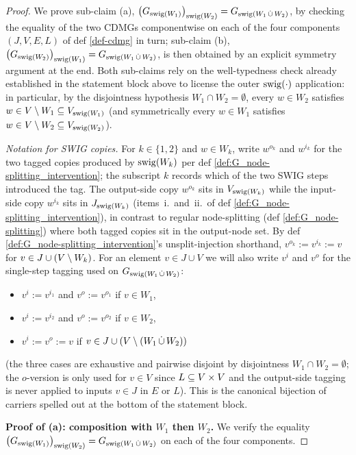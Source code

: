 \documentclass[main]{subfiles}
\begin{document}
\begin{proof}
We prove sub-claim (a), $\left ( G_{\mathrm{swig}(W_1)} \right )_{\mathrm{swig}(W_2)} = G_{\mathrm{swig}(W_1 \,\dot{\cup}\, W_2)}$, by checking the equality of the two CDMGs componentwise on each of the four components $(J, V, E, L)$ of def \ref{def-cdmg} in turn; sub-claim (b), $\left ( G_{\mathrm{swig}(W_2)} \right )_{\mathrm{swig}(W_1)} = G_{\mathrm{swig}(W_1 \,\dot{\cup}\, W_2)}$, is then obtained by an explicit symmetry argument at the end. Both sub-claims rely on the well-typedness check already established in the statement block above to license the outer $\mathrm{swig}(\cdot)$ application: in particular, by the disjointness hypothesis $W_1 \cap W_2 = \emptyset$, every $w \in W_2$ satisfies $w \in V \setminus W_1 \subseteq V_{\mathrm{swig}(W_1)}$ (and symmetrically every $w \in W_1$ satisfies $w \in V \setminus W_2 \subseteq V_{\mathrm{swig}(W_2)}$).

\smallskip\noindent\emph{Notation for SWIG copies.}
For $k \in \{1, 2\}$ and $w \in W_k$, write $w^{o_k}$ and $w^{i_k}$ for the two tagged copies produced by $\mathrm{swig}(W_k)$ per def \ref{def:G_node-splitting_intervention}; the subscript $k$ records which of the two SWIG steps introduced the tag. The output-side copy $w^{o_k}$ sits in $V_{\mathrm{swig}(W_k)}$ while the input-side copy $w^{i_k}$ sits in $J_{\mathrm{swig}(W_k)}$ (items~i.\ and~ii.\ of def \ref{def:G_node-splitting_intervention}), in contrast to regular node-splitting (def \ref{def:G_node-splitting}) where both tagged copies sit in the output-node set. By def \ref{def:G_node-splitting_intervention}'s unsplit-injection shorthand, $v^{o_k} := v^{i_k} := v$ for $v \in J \cup (V \setminus W_k)$. For an element $v \in J \cup V$ we will also write $v^i$ and $v^o$ for the single-step tagging used on $G_{\mathrm{swig}(W_1 \,\dot{\cup}\, W_2)}$:
\begin{itemize}
    \item $v^i := v^{i_1}$ and $v^o := v^{o_1}$ if $v \in W_1$,
    \item $v^i := v^{i_2}$ and $v^o := v^{o_2}$ if $v \in W_2$,
    \item $v^i := v^o := v$ if $v \in J \cup (V \setminus (W_1 \,\dot{\cup}\, W_2))$
\end{itemize}
(the three cases are exhaustive and pairwise disjoint by disjointness $W_1 \cap W_2 = \emptyset$; the $o$-version is only used for $v \in V$ since $L \subseteq V \times V$ and the output-side tagging is never applied to inputs $v \in J$ in $E$ or $L$). This is the canonical bijection of carriers spelled out at the bottom of the statement block.

\medskip\noindent\textbf{Proof of (a): composition with $W_1$ then $W_2$.}
We verify the equality $\left ( G_{\mathrm{swig}(W_1)} \right )_{\mathrm{swig}(W_2)} = G_{\mathrm{swig}(W_1 \,\dot{\cup}\, W_2)}$ on each of the four components.


\end{proof}
\end{document}
